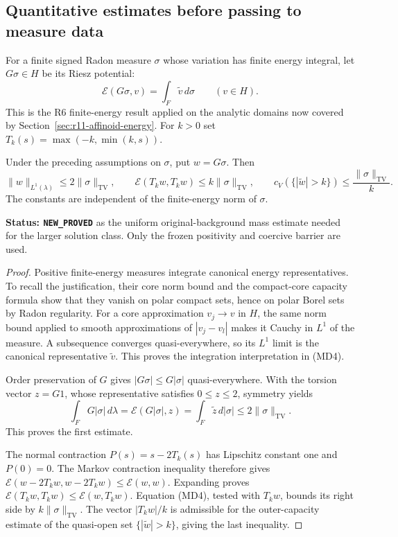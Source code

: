 \subsection{Quantitative estimates before passing to measure data}

For a finite signed Radon measure $\sigma$ whose variation has
finite energy integral, let $G\sigma\in H$ be its Riesz potential:
\[
               \mathcal E(G\sigma,v)=\int_F\widetilde v\,d\sigma
                                 \qquad(v\in H).
 \tag{MD4}
\]
This is the R6 finite-energy result applied on the analytic
domains now covered by Section~\ref{sec:r11-affinoid-energy}.
For $k>0$ set $T_k(s)=\max(-k,\min(k,s))$.

\begin{lemma}
\label{lem:r11-finite-energy-mass-estimates}
Under the preceding assumptions on $\sigma$, put $w=G\sigma$.
Then
\[
 \|w\|_{L^1(\lambda)}\leq2\|\sigma\|_{\mathrm{TV}},\qquad
 \mathcal E(T_k w,T_k w)\leq k\|\sigma\|_{\mathrm{TV}},\qquad
 c_V(\{|\widetilde w|>k\})\leq\frac{\|\sigma\|_{\mathrm{TV}}}{k}.
 \tag{MD5}
\]
The constants are independent of the finite-energy norm of $\sigma$.
\end{lemma}

\noindent\textbf{Status: \texttt{NEW\_PROVED}} as the uniform
original-background mass estimate needed for the larger solution class.
Only the frozen positivity and coercive barrier are used.

\begin{proof}
Positive finite-energy measures integrate canonical energy
representatives.  To recall the justification, their core norm
bound and the compact-core capacity formula show that they
vanish on polar compact sets, hence on polar Borel sets by Radon
regularity.  For a core approximation $v_j\to v$ in $H$,
the same norm bound applied to smooth approximations of
$|v_j-v_l|$ makes it Cauchy in $L^1$ of the measure.
A subsequence converges quasi-everywhere, so its $L^1$ limit is
the canonical representative $\widetilde v$.
This proves the integration interpretation in (MD4).

Order preservation of $G$ gives
$|G\sigma|\leq G|\sigma|$ quasi-everywhere.  With the torsion
vector $z=G1$, whose representative satisfies $0\leq z\leq2$,
symmetry yields
\[
 \int_FG|\sigma|\,d\lambda
       =\mathcal E(G|\sigma|,z)
       =\int_F\widetilde z\,d|\sigma|
       \leq2\|\sigma\|_{\mathrm{TV}}.
 \tag{MD6}
\]
This proves the first estimate.

The normal contraction $P(s)=s-2T_k(s)$ has Lipschitz constant
one and $P(0)=0$.  The Markov contraction inequality therefore
gives
$\mathcal E(w-2T_kw,w-2T_kw)\leq\mathcal E(w,w)$.
Expanding proves
$\mathcal E(T_kw,T_kw)\leq\mathcal E(w,T_kw)$.
Equation (MD4), tested with $T_kw$, bounds its right side by
$k\|\sigma\|_{\mathrm{TV}}$.  The vector $|T_kw|/k$ is
admissible for the outer-capacity estimate of the quasi-open
set $\{|\widetilde w|>k\}$, giving the last inequality.
\end{proof}

